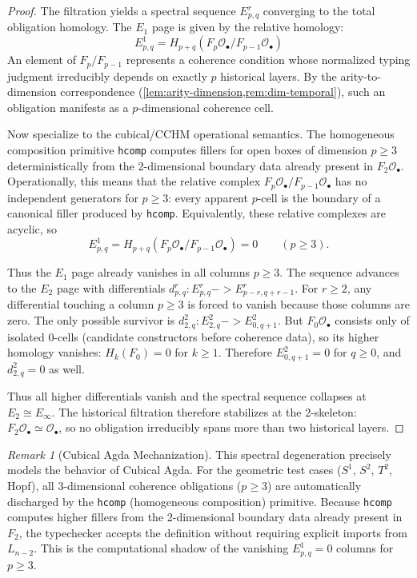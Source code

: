 \documentclass[11pt,a4paper]{article}
\def\to{->}%
\theoremstyle{plain}
\theoremstyle{definition}
\theoremstyle{remark}
\newtheorem{remark}[theorem]{Remark}
\begin{document}
\begin{proof}
The filtration yields a spectral sequence $E^r_{p,q}$ converging to the total obligation homology. The $E_1$ page is given by the relative homology:
\begin{equation}
    E^1_{p,q} = H_{p+q}(F_p \mathcal{O}_\bullet / F_{p-1} \mathcal{O}_\bullet)
\end{equation}
An element of $F_p / F_{p-1}$ represents a coherence condition whose normalized typing judgment irreducibly depends on exactly $p$ historical layers.
By the arity-to-dimension correspondence (\cref{lem:arity-dimension,rem:dim-temporal}), such an obligation manifests as a $p$-dimensional coherence cell.

Now specialize to the cubical/CCHM operational semantics.
The homogeneous composition primitive \texttt{hcomp} computes fillers for open boxes of dimension $p \ge 3$ deterministically from the 2-dimensional boundary data already present in $F_2 \mathcal{O}_\bullet$.
Operationally, this means that the relative complex $F_p \mathcal{O}_\bullet / F_{p-1} \mathcal{O}_\bullet$ has no independent generators for $p \ge 3$: every apparent $p$-cell is the boundary of a canonical filler produced by \texttt{hcomp}.
Equivalently, these relative complexes are acyclic, so
\[
  E^1_{p,q} = H_{p+q}(F_p \mathcal{O}_\bullet / F_{p-1} \mathcal{O}_\bullet)=0
  \qquad (p \ge 3).
\]

Thus the $E_1$ page already vanishes in all columns $p \ge 3$.
The sequence advances to the $E_2$ page with differentials $d^r_{p,q} : E^r_{p,q} \to E^r_{p-r, q+r-1}$.
For $r \ge 2$, any differential touching a column $p \ge 3$ is forced to vanish because those columns are zero.
The only possible survivor is $d^2_{2,q} : E^2_{2,q} \to E^2_{0, q+1}$.
But $F_0 \mathcal{O}_\bullet$ consists only of isolated 0-cells (candidate constructors before coherence data), so its higher homology vanishes: $H_k(F_0)=0$ for $k \ge 1$.
Therefore $E^2_{0,q+1}=0$ for $q \ge 0$, and $d^2_{2,q}=0$ as well.

Thus all higher differentials vanish and the spectral sequence collapses at $E_2 \cong E_\infty$.
The historical filtration therefore stabilizes at the 2-skeleton: $F_2 \mathcal{O}_\bullet \simeq \mathcal{O}_\bullet$, so no obligation irreducibly spans more than two historical layers.
\end{proof}

\begin{remark}[Cubical Agda Mechanization]
This spectral degeneration precisely models the behavior of Cubical Agda. For the geometric test cases ($S^1$, $S^2$, $T^2$, Hopf), all 3-dimensional coherence obligations ($p \ge 3$) are automatically discharged by the \texttt{hcomp} (homogeneous composition) primitive. Because \texttt{hcomp} computes higher fillers from the 2-dimensional boundary data already present in $F_2$, the typechecker accepts the definition without requiring explicit imports from $L_{n-2}$. This is the computational shadow of the vanishing $E^1_{p,q}=0$ columns for $p \ge 3$.
\end{remark}
\end{document}
